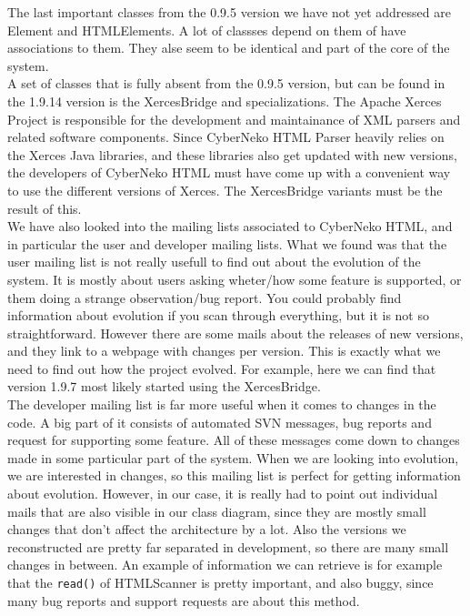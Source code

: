 \documentclass[a4paper,11pt]{article}
\begin{document}
			The last important classes from the 0.9.5 version we have not yet addressed are Element and HTMLElements. A lot of classses depend on them of have associations to them. They alse seem to be identical and part of the core of the system.\\

			A set of classes that is fully absent from the 0.9.5 version, but can be found in the 1.9.14 version is the XercesBridge and specializations. The Apache Xerces Project is responsible for the development and maintainance of XML parsers and related software components. Since CyberNeko HTML Parser heavily relies on the Xerces Java libraries, and these libraries also get updated with new versions, the developers of CyberNeko HTML must have come up with a convenient way to use the different versions of Xerces. The XercesBridge variants must be the result of this. \\
			
			We have also looked into the mailing lists associated to CyberNeko HTML, and in particular the user and developer mailing lists. What we found was that the user mailing list is not really usefull to find out about the evolution of the system. It is mostly about users asking wheter/how some feature is supported, or them doing a strange observation/bug report. You could probably find information about evolution if you scan through everything, but it is not so straightforward. However there are some mails about the releases of new versions, and they link to a webpage with changes per version. This is exactly what we need to find out how the project evolved. For example, here we can find that version 1.9.7 most likely started using the XercesBridge.\\

			The developer mailing list is far more useful when it comes to changes in the code. A big part of it consists of automated SVN messages, bug reports and request for supporting some feature. All of these messages come down to changes made in some particular part of the system. When we are looking into evolution, we are interested in changes, so this mailing list is perfect for getting information about evolution. However, in our case, it is really had to point out individual mails that are also visible in our class diagram, since they are mostly small changes that don't affect the architecture by a lot. Also the versions we reconstructed are pretty far separated in development, so there are many small changes in between. An example of information we can retrieve is for example that the \texttt{read()} of HTMLScanner is pretty important, and also buggy, since many bug reports and support requests are about this method. \\
			
\end{document}
